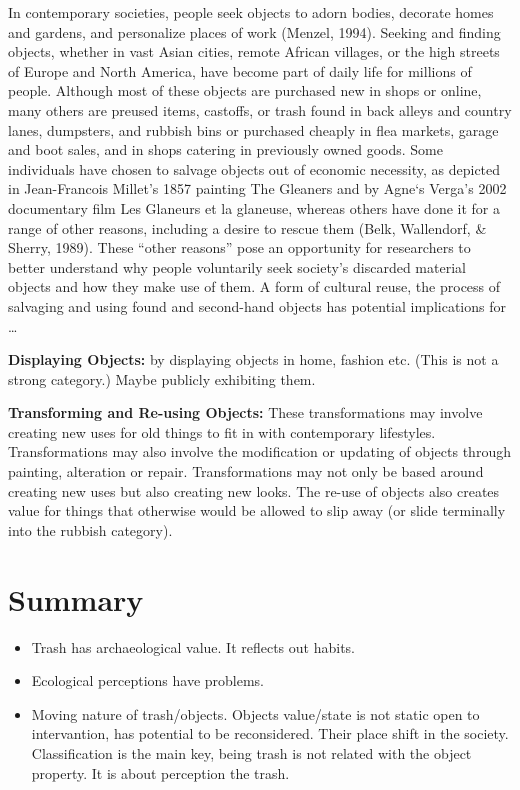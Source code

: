 In contemporary societies, people seek objects to adorn bodies, decorate homes and gardens, and personalize places of work (Menzel, 1994). Seeking and finding objects, whether in vast Asian cities, remote African villages, or the high streets of Europe and North America, have become part of daily life for millions of people. Although most of these objects are purchased new in shops or online, many others are preused items, castoffs, or trash found in back alleys and country lanes, dumpsters, and rubbish bins or purchased cheaply in flea markets, garage and boot sales, and in shops catering in previously owned goods. Some individuals have chosen to salvage objects out of economic necessity, as depicted in Jean-Francois Millet’s 1857 painting The Gleaners and by Agne`s Verga’s 2002 documentary film Les Glaneurs et la glaneuse, whereas others have done it for a range of other reasons, including a desire to rescue them (Belk, Wallendorf, \& Sherry, 1989). These “other reasons” pose an opportunity for researchers to better understand why people voluntarily seek society’s discarded material objects and how they make use of them. A form of cultural reuse, the process
of salvaging and using found and second-hand objects has potential implications for \ldots 


\textbf{Displaying Objects:} by displaying objects in home, fashion etc. (This is not a strong category.) Maybe publicly exhibiting them. 

\textbf{Transforming and Re-using Objects:} These transformations may involve creating new uses for old things to fit in with contemporary lifestyles. Transformations may also involve the modification or updating of objects through painting, alteration or repair. Transformations may not only be based around creating new uses but also creating new looks. The re-use of objects also creates value for things that otherwise would be allowed to slip away (or slide terminally into the rubbish category).





%
%
\section{Summary}
\begin{itemize}
\item Trash has archaeological value. It reflects out habits.
\item Ecological perceptions have problems. 
\item Moving nature of trash/objects. Objects value/state is not static open to intervantion, has potential to be reconsidered. Their place shift in the society. Classification is the main key, being trash is not related with the object property. It is about perception the trash.
\end{itemize}

